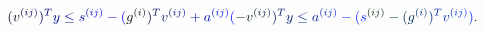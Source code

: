 \documentclass[12pt]{article}
\begin{document}
\makeatletter
\renewcommand*{\@textcolor}[3]{%
  \protect\leavevmode
  \begingroup
    \color#1{#2}#3%
  \endgroup
}
\makeatother
\begin{displaymath}
\mathcolor[RGB]{0,0,15}{(} \mathcolor[RGB]{0,0,30}{v} ^ { \mathcolor[RGB]{0,0,45}{(} \mathcolor[RGB]{0,0,60}{i} \mathcolor[RGB]{0,0,75}{j} \mathcolor[RGB]{0,0,90}{)} } \mathcolor[RGB]{0,0,105}{)} ^ { \mathcolor[RGB]{0,0,120}{T} } \mathcolor[RGB]{0,0,135}{y} \mathcolor[RGB]{0,0,150}{\leq} \mathcolor[RGB]{0,0,165}{s} ^ { \mathcolor[RGB]{0,0,180}{(} \mathcolor[RGB]{0,0,195}{i} \mathcolor[RGB]{0,0,210}{j} \mathcolor[RGB]{0,0,225}{)} } \mathcolor[RGB]{0,0,240}{-} \mathcolor[RGB]{0,0,255}{(} \mathcolor[RGB]{0,15,0}{g} ^ { \mathcolor[RGB]{0,15,15}{(} \mathcolor[RGB]{0,15,30}{i} \mathcolor[RGB]{0,15,45}{)} } \mathcolor[RGB]{0,15,60}{)} ^ { \mathcolor[RGB]{0,15,75}{T} } \mathcolor[RGB]{0,15,90}{v} ^ { \mathcolor[RGB]{0,15,105}{(} \mathcolor[RGB]{0,15,120}{i} \mathcolor[RGB]{0,15,135}{j} \mathcolor[RGB]{0,15,150}{)} } \mathcolor[RGB]{0,15,165}{+} \mathcolor[RGB]{0,15,180}{a} ^ { \mathcolor[RGB]{0,15,195}{(} \mathcolor[RGB]{0,15,210}{i} \mathcolor[RGB]{0,15,225}{j} \mathcolor[RGB]{0,15,240}{)} } \mathcolor[RGB]{0,15,255}{(} \mathcolor[RGB]{0,30,0}{-} \mathcolor[RGB]{0,30,15}{v} ^ { \mathcolor[RGB]{0,30,30}{(} \mathcolor[RGB]{0,30,45}{i} \mathcolor[RGB]{0,30,60}{j} \mathcolor[RGB]{0,30,75}{)} } \mathcolor[RGB]{0,30,90}{)} ^ { \mathcolor[RGB]{0,30,105}{T} } \mathcolor[RGB]{0,30,120}{y} \mathcolor[RGB]{0,30,135}{\leq} \mathcolor[RGB]{0,30,150}{a} ^ { \mathcolor[RGB]{0,30,165}{(} \mathcolor[RGB]{0,30,180}{i} \mathcolor[RGB]{0,30,195}{j} \mathcolor[RGB]{0,30,210}{)} } \mathcolor[RGB]{0,30,225}{-} \mathcolor[RGB]{0,30,240}{(} \mathcolor[RGB]{0,30,255}{s} ^ { \mathcolor[RGB]{0,45,0}{(} \mathcolor[RGB]{0,45,15}{i} \mathcolor[RGB]{0,45,30}{j} \mathcolor[RGB]{0,45,45}{)} } \mathcolor[RGB]{0,45,60}{-} \mathcolor[RGB]{0,45,75}{(} \mathcolor[RGB]{0,45,90}{g} ^ { \mathcolor[RGB]{0,45,105}{(} \mathcolor[RGB]{0,45,120}{i} \mathcolor[RGB]{0,45,135}{)} } \mathcolor[RGB]{0,45,150}{)} ^ { \mathcolor[RGB]{0,45,165}{T} } \mathcolor[RGB]{0,45,180}{v} ^ { \mathcolor[RGB]{0,45,195}{(} \mathcolor[RGB]{0,45,210}{i} \mathcolor[RGB]{0,45,225}{j} \mathcolor[RGB]{0,45,240}{)} } \mathcolor[RGB]{0,45,255}{)} \mathcolor[RGB]{0,60,0}{.}
\end{displaymath}
\end{document}
